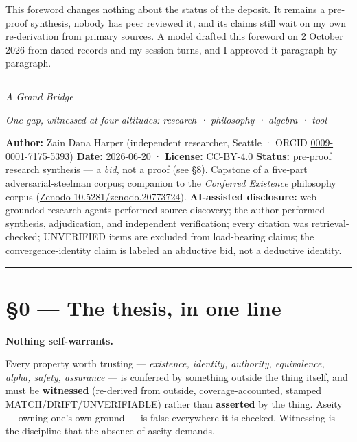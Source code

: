 \documentclass[11pt]{article}
\begin{document}
This foreword changes nothing about the status of the deposit. It remains a pre-proof synthesis, nobody has peer reviewed it, and its claims still wait on my own re-derivation from primary sources. A model drafted this foreword on 2 October 2026 from dated records and my session turns, and I approved it paragraph by paragraph.

\medskip\noindent\rule{\linewidth}{0.6pt}\medskip


{\large\emph{A Grand Bridge}\par}

{\large\emph{One gap, witnessed at four altitudes: research · philosophy · algebra · tool}\par}

\textbf{Author:} Zain Dana Harper (independent researcher, Seattle · ORCID \href{https://orcid.org/0009-0001-7175-5393}{0009-0001-7175-5393}) \textbf{Date:} 2026-06-20 · \textbf{License:} CC-BY-4.0 \textbf{Status:} pre-proof research synthesis — a \emph{bid}, not a proof (see §8). Capstone of a five-part adversarial-steelman corpus; companion to the \emph{Conferred Existence} philosophy corpus (\href{https://doi.org/10.5281/zenodo.20773724}{Zenodo 10.5281/\allowbreak{}zenodo.20773724}). \textbf{AI-assisted disclosure:} web-grounded research agents performed source discovery; the author performed synthesis, adjudication, and independent verification; every citation was retrieval-checked; UNVERIFIED items are excluded from load-bearing claims; the convergence-identity claim is labeled an abductive bid, not a deductive identity.

\medskip\noindent\rule{\linewidth}{0.3pt}\medskip

\section*{§0 — The thesis, in one line}

\textbf{Nothing self-warrants.}

Every property worth trusting — \emph{existence, identity, authority, equivalence, alpha, safety, assurance} — is conferred by something outside the thing itself, and must be \textbf{witnessed} (re-derived from outside, coverage-accounted, stamped MATCH/\allowbreak{}DRIFT/\allowbreak{}UNVERIFIABLE) rather than \textbf{asserted} by the thing. Aseity — owning one's own ground — is false everywhere it is checked. Witnessing is the discipline that the absence of aseity demands.
\end{document}
